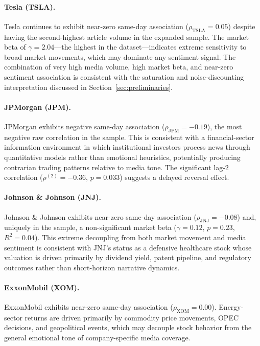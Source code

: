 \documentclass[lettersize,journal]{IEEEtran}
\begin{document}
\paragraph{Tesla (TSLA).}
Tesla continues to exhibit near-zero same-day association ($\rho_{\mathrm{TSLA}} = 0.05$) despite having the second-highest article volume in the expanded sample. The market beta of $\gamma = 2.04$---the highest in the dataset---indicates extreme sensitivity to broad market movements, which may dominate any sentiment signal. The combination of very high media volume, high market beta, and near-zero sentiment association is consistent with the saturation and noise-discounting interpretation discussed in Section~\ref{sec:preliminaries}.

\paragraph{JPMorgan (JPM).}
JPMorgan exhibits negative same-day association ($\rho_{\mathrm{JPM}} = -0.19$), the most negative raw correlation in the sample. This is consistent with a financial-sector information environment in which institutional investors process news through quantitative models rather than emotional heuristics, potentially producing contrarian trading patterns relative to media tone. The significant lag-2 correlation ($\rho^{(2)} = -0.36$, $p = 0.033$) suggests a delayed reversal effect.

\paragraph{Johnson \& Johnson (JNJ).}
Johnson \& Johnson exhibits near-zero same-day association ($\rho_{\mathrm{JNJ}} = -0.08$) and, uniquely in the sample, a non-significant market beta ($\gamma = 0.12$, $p = 0.23$, $R^2 = 0.04$). This extreme decoupling from both market movement and media sentiment is consistent with JNJ's status as a defensive healthcare stock whose valuation is driven primarily by dividend yield, patent pipeline, and regulatory outcomes rather than short-horizon narrative dynamics.

\paragraph{ExxonMobil (XOM).}
ExxonMobil exhibits near-zero same-day association ($\rho_{\mathrm{XOM}} = 0.00$). Energy-sector returns are driven primarily by commodity price movements, OPEC decisions, and geopolitical events, which may decouple stock behavior from the general emotional tone of company-specific media coverage.
\end{document}
